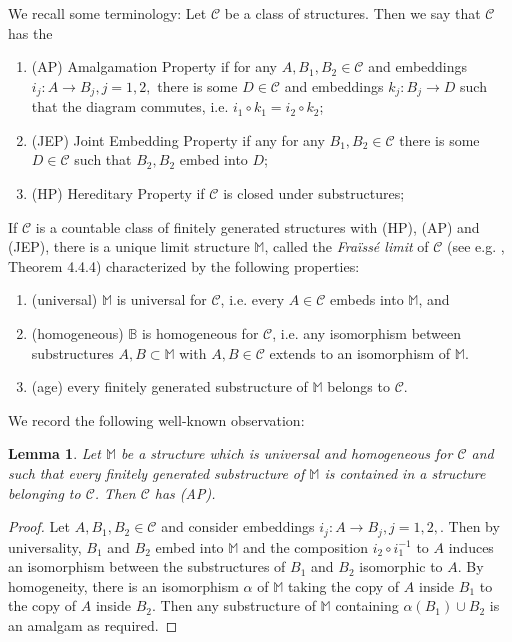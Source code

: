\documentclass{amsart}
\newcommand{\inv}{^{-1}}
\newtheorem{lemma}[defi]{Lemma}
\begin{document}
We recall some terminology:
Let $\mathcal{C}$ be a class of structures. Then we say that $\mathcal{C}$ has the

\begin{enumerate}
\item (AP) Amalgamation Property if for any $A, B_1, B_2\in\mathcal{C}$ and embeddings $i_j:A\longrightarrow B_j, j=1,2,$ there is some $D\in\mathcal{C}$ and embeddings $k_j: B_j\longrightarrow D$ such that the diagram commutes, i.e. $i_1\circ k_1=i_2\circ k_2$;
\item (JEP) Joint Embedding Property if any for any $B_1, B_2\in\mathcal{C}$ there is some $D\in\mathcal{C}$ such that $B_2, B_2$ embed into $D$;
\item (HP) Hereditary Property if $\mathcal{C}$ is closed under substructures;

\end{enumerate}

If $\mathcal{C}$ is a countable class of finitely generated structures with (HP), (AP) and (JEP),  there is a unique limit structure $\mathbb{M}$, called the \emph{Fra\"iss\'e limit} of $\mathcal{C}$ (see e.g. \cite{TZmodel theory}, Theorem 4.4.4) characterized by the following  properties:
\begin{enumerate}
\item (universal) $\mathbb{M}$ is universal for $\mathcal{C}$, i.e. every $A\in\mathcal{C}$ embeds into $\mathbb{M}$, and
\item (homogeneous) $\mathbb{B}$ is homogeneous for $\mathcal{C}$, i.e. any isomorphism between substructures $A, B\subset \mathbb{M}$ with $A, B\in\mathcal{C}$ extends to an isomorphism of $\mathbb{M}$.
\item (age) every finitely generated substructure of $\mathbb{M}$ belongs to $\mathcal{C}$.
\end{enumerate}

We record the following well-known observation:
\begin{lemma}\label{lem:homogenous implies amalgamation}
Let $\mathbb{M}$ be a structure which is universal and homogeneous for $\mathcal{C}$ and such that every finitely generated substructure of $\mathbb{M}$ is contained in a structure belonging to $\mathcal{C}$. Then $\mathcal{C}$ has (AP).
\end{lemma}
\begin{proof}
Let $A, B_1, B_2\in\mathcal{C}$ and consider embeddings $i_j:A\longrightarrow B_j, j=1,2,$. Then by universality, $B_1$ and $B_2$ embed into $\mathbb{M}$ and the composition $i_2\circ i_1\inv$ to $A$ induces an isomorphism between the substructures of $B_1$ and $B_2$ isomorphic to $A$. By homogeneity, there is an isomorphism $\alpha$ of $\mathbb{M}$ taking the copy of $A$ inside $B_1$ to the copy of $A$ inside $B_2$. Then any substructure of $\mathbb{M}$ containing $\alpha(B_1)\cup B_2$ is an amalgam as required.
\end{proof}
\end{document}
